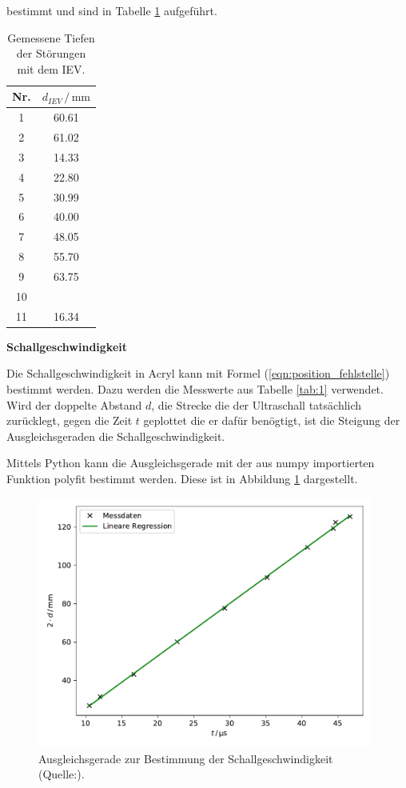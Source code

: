 bestimmt und sind in Tabelle \ref{tab:2} aufgeführt.

\begin{table}
    \centering
    \caption{Gemessene Tiefen der Störungen mit dem IEV.}
    \begin{tabular}{c c}
        \toprule
        {Nr.} & {$d_{IEV} \, / \, \si{\milli\meter}$} \\
        \midrule
     1  & 60.61  \\
     2  & 61.02 \\
     3  & 14.33 \\
     4  & 22.80  \\
     5  & 30.99  \\
     6  & 40.00 \\
     7  & 48.05  \\
     8  & 55.70  \\
     9  & 63.75  \\    
     10 &       \\
     11 & 16.34 \\
        \bottomrule
    \end{tabular}
    \label{tab:2}
\end{table}

\noindent
\textbf{Schallgeschwindigkeit}

\noindent
Die Schallgeschwindigkeit in Acryl kann mit Formel (\ref{eqn:position_fehlstelle})%
bestimmt werden.
Dazu werden die Messwerte aus Tabelle \ref{tab:1} verwendet.
Wird der doppelte Abstand $d$, die Strecke die der Ultraschall tatsächlich zurücklegt,
gegen die Zeit $t$ geplottet die er dafür benögtigt, ist die Steigung der Ausgleichsgeraden
die Schallgeschwindigkeit.


\noindent
Mittels Python kann die Ausgleichsgerade mit der aus numpy \cite{numpy} importierten Funktion polyfit bestimmt werden.
Diese ist in Abbildung \ref{fig:schall} dargestellt.

\begin{figure}
    \centering
    \includegraphics[width=11cm]{Daten/schall.pdf}
    \caption{Ausgleichsgerade zur Bestimmung der Schallgeschwindigkeit (Quelle:\cite{US1}).}
    \label{fig:schall}
  \end{figure}
  
